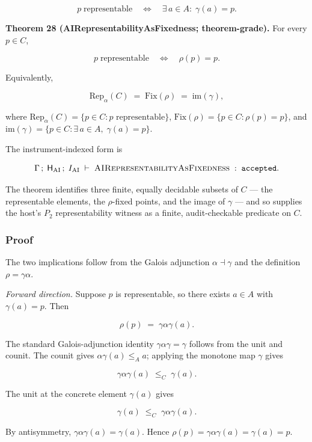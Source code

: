 \documentclass[11pt]{article}
\theoremstyle{definition}
\begin{document}
\[
p\;\text{representable}\quad\Longleftrightarrow\quad\exists\,a\in A:\;\gamma(a)=p.
\]

\textbf{Theorem 28 (AIRepresentabilityAsFixedness; theorem-grade).} For every \(p\in C\),

\[
p\;\text{representable}\quad\Longleftrightarrow\quad\rho(p)=p.
\]

Equivalently,

\[
\mathrm{Rep}_{\alpha}(C)\;=\;\mathrm{Fix}(\rho)\;=\;\mathrm{im}(\gamma),
\]

where \(\mathrm{Rep}_{\alpha}(C)=\{p\in C:p\text{ representable}\}\), \(\mathrm{Fix}(\rho)=\{p\in C:\rho(p)=p\}\), and \(\mathrm{im}(\gamma)=\{p\in C:\exists\,a\in A,\;\gamma(a)=p\}\).

The instrument-indexed form is

\[
\Gamma\,;\;\mathsf H_{\mathrm{AI}}\,;\;I_{\mathrm{AI}}\;\vdash\;\textsc{AIRepresentabilityAsFixedness}\;:\;\texttt{accepted}.
\]

The theorem identifies three finite, equally decidable subsets of \(C\) --- the representable elements, the \(\rho\)-fixed points, and the image of \(\gamma\) --- and so supplies the host's \(P_2\) representability witness as a finite, audit-checkable predicate on \(C\).

\subsubsection{Proof}

The two implications follow from the Galois adjunction \(\alpha\dashv\gamma\) and the definition \(\rho=\gamma\alpha\).

\emph{Forward direction.} Suppose \(p\) is representable, so there exists \(a\in A\) with \(\gamma(a)=p\). Then

\[
\rho(p)\;=\;\gamma\alpha\gamma(a).
\]

The standard Galois-adjunction identity \(\gamma\alpha\gamma=\gamma\) follows from the unit and counit. The counit gives \(\alpha\gamma(a)\le_A a\); applying the monotone map \(\gamma\) gives

\[
\gamma\alpha\gamma(a)\;\le_C\;\gamma(a).
\]

The unit at the concrete element \(\gamma(a)\) gives

\[
\gamma(a)\;\le_C\;\gamma\alpha\gamma(a).
\]

By antisymmetry, \(\gamma\alpha\gamma(a)=\gamma(a)\). Hence \(\rho(p)=\gamma\alpha\gamma(a)=\gamma(a)=p\).
\end{document}
